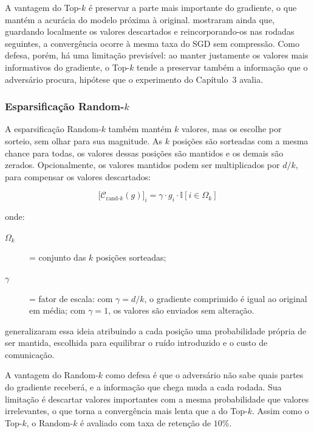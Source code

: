 A vantagem do Top-$k$ é preservar a parte mais importante do gradiente, o que mantém a acurácia do modelo próxima à original.  mostraram ainda que, guardando localmente os valores descartados e reincorporando-os nas rodadas seguintes, a convergência ocorre à mesma taxa do SGD sem compressão. Como defesa, porém, há uma limitação previsível: ao manter justamente os valores mais informativos do gradiente, o Top-$k$ tende a preservar também a informação que o adversário procura, hipótese que o experimento do Capítulo~3 avalia.

\subsubsection{Esparsificação Random-$k$}

A esparsificação Random-$k$ também mantém $k$ valores, mas os escolhe por sorteio, sem olhar para sua magnitude. As $k$ posições são sorteadas com a mesma chance para todas, os valores dessas posições são mantidos e os demais são zerados. Opcionalmente, os valores mantidos podem ser multiplicados por $d/k$, para compensar os valores descartados:

\begin{equation} \label{eq:randk}
\big[\mathcal{C}_{\text{rand-}k}(g)\big]_i = \gamma \cdot g_i \cdot \mathbb{I}[i \in \Omega_k]
\end{equation}

\noindent onde:
\begin{description}
  \item[$\Omega_k$] = conjunto das $k$ posições sorteadas;
  \item[$\gamma$] = fator de escala: com $\gamma = d/k$, o gradiente comprimido é igual ao original em média; com $\gamma = 1$, os valores são enviados sem alteração.
\end{description}

 generalizaram essa ideia atribuindo a cada posição uma probabilidade própria de ser mantida, escolhida para equilibrar o ruído introduzido e o custo de comunicação.

A vantagem do Random-$k$ como defesa é que o adversário não sabe quais partes do gradiente receberá, e a informação que chega muda a cada rodada. Sua limitação é descartar valores importantes com a mesma probabilidade que valores irrelevantes, o que torna a convergência mais lenta que a do Top-$k$. Assim como o Top-$k$, o Random-$k$ é avaliado com taxa de retenção de $10\%$.


